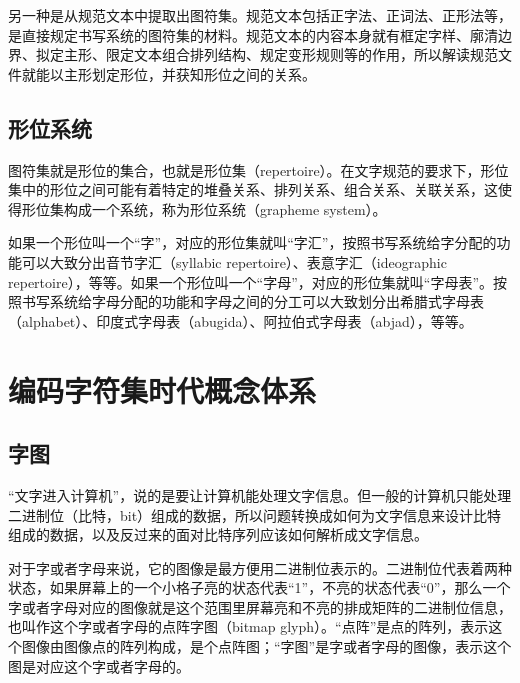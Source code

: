 \documentclass{brochure}
\begin{document}
另一种是从规范文本中提取出图符集。规范文本包括正字法、正词法、正形法等，是直接规定书写系统的图符集的材料。规范文本的内容本身就有框定字样、廓清边界、拟定主形、限定文本组合排列结构、规定变形规则等的作用，所以解读规范文件就能以主形划定形位，并获知形位之间的关系。

\subsection{形位系统}

图符集就是形位的集合，也就是形位集（repertoire）。在文字规范的要求下，形位集中的形位之间可能有着特定的堆叠关系、排列关系、组合关系、关联关系，这使得形位集构成一个系统，称为形位系统（grapheme system）。

如果一个形位叫一个“字”，对应的形位集就叫“字汇”，按照书写系统给字分配的功能可以大致分出音节字汇（syllabic repertoire）、表意字汇（ideographic repertoire），等等。如果一个形位叫一个“字母”，对应的形位集就叫“字母表”。按照书写系统给字母分配的功能和字母之间的分工可以大致划分出希腊式字母表（alphabet）、印度式字母表（abugida）、阿拉伯式字母表（abjad），等等。

\section{编码字符集时代概念体系}

\subsection{字图}

“文字进入计算机”，说的是要让计算机能处理文字信息。但一般的计算机只能处理二进制位（比特，bit）组成的数据，所以问题转换成如何为文字信息来设计比特组成的数据，以及反过来的面对比特序列应该如何解析成文字信息。

对于字或者字母来说，它的图像是最方便用二进制位表示的。二进制位代表着两种状态，如果屏幕上的一个小格子亮的状态代表“1”，不亮的状态代表“0”，那么一个字或者字母对应的图像就是这个范围里屏幕亮和不亮的排成矩阵的二进制位信息，也叫作这个字或者字母的点阵字图（bitmap glyph）。“点阵”是点的阵列，表示这个图像由图像点的阵列构成，是个点阵图；“字图”是字或者字母的图像，表示这个图是对应这个字或者字母的。
\end{document}
